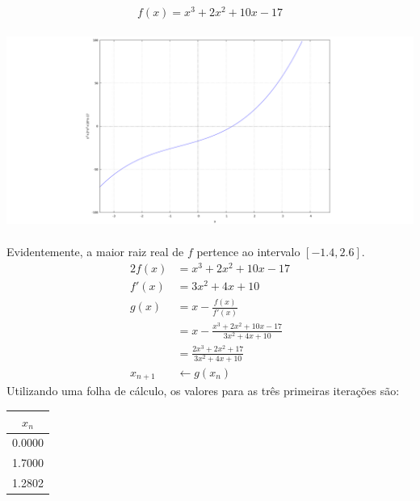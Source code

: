 \setcounter{chapter}{11}
\begin{equation*}
	f(x)=x^3+2x^2+10x-17
\end{equation*}
\begin{center} \includegraphics[height=65mm,keepaspectratio]{plot2012T1-1} \end{center}
Evidentemente, a maior raiz real de $f$ pertence ao intervalo $[-1.4, 2.6]$.
\begin{alignat*}{2}
	f(x) &=x^3+2x^2+10x-17\\
	f'(x)&=3x^2+4x+10\\
	g(x) &=x-\frac{f(x)}{f'(x)}\\
	     &=x-\frac{x^3+2x^2+10x-17}{3x^2+4x+10}\\
	     &=\frac{2x^3+2x^2+17}{3x^2+4x+10}\\
	x_{n+1} &\leftarrow g(x_n) 
\end{alignat*}
Utilizando uma folha de cálculo, os valores para as três primeiras iterações são:
\begin{center}
\begin{tabular}{c}
	$x_n$ \\ \hline
	0.0000 \\
	1.7000 \\
	1.2802
\end{tabular}
\end{center}

